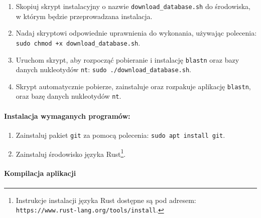                 \begin{enumerate}
                    \item {
                        Skopiuj skrypt instalacyjny o nazwie \texttt{download\_database.sh} do środowiska, w którym będzie przeprowadzana instalacja.
                    }
                    \item {
                        Nadaj skryptowi odpowiednie uprawnienia do wykonania, używając polecenia: \texttt{sudo chmod +x download\_database.sh}.
                    }
                    \item {
                        Uruchom skrypt, aby rozpocząć pobieranie i instalację \texttt{blastn} oraz bazy danych nukleotydów \texttt{nt}: \texttt{sudo ./download\_database.sh}.
                    }
                    \item {
                        Skrypt automatycznie pobierze, zainstaluje oraz rozpakuje aplikację \texttt{blastn}, oraz bazę danych nukleotydów \texttt{nt}.
                    }
                \end{enumerate}

            \paragraph{Instalacja wymaganych programów:}

                \begin{enumerate}
                    \item {
                        Zainstaluj pakiet \texttt{git} za pomocą polecenia: \texttt{sudo apt install git}.
                    }
                    \item {
                        Zainstaluj środowisko języka Rust\footnote{Instrukcje instalacji języka Rust dostępne są pod adresem: \texttt{https://www.rust-lang.org/tools/install}.}.
                    }
                \end{enumerate}

            \paragraph{Kompilacja aplikacji}
                
